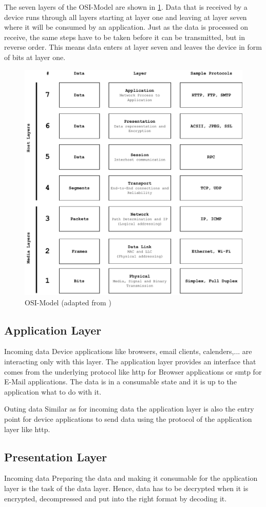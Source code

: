 The seven layers of the OSI-Model are shown in \cref{fig:osimodel}. Data that is received by a device runs through all layers starting at layer one and leaving at layer seven where it will be consumed by an application. Just as the data is processed on receive, the same steps have to be taken before it can be transmitted, but in reverse order. This means data enters at layer seven and leaves the device in form of bits at layer one.

\begin{figure}
\centering
\includegraphics[width=.5\textwidth]{graphics/osi-modell.pdf}
\caption{OSI-Model (adapted from \citet{wiki:osi-model})}
\label{fig:osimodel}
\end{figure}

\subsection{Application Layer}
Incoming data\newline
Device applications like browsers, email clients, calenders,... are interacting only with this layer. The application layer provides an interface that comes from the underlying protocol like \gls{http} for Browser applications or \gls{smtp} for E-Mail applications. The data is in a consumable state and it is up to the application what to do with it.

Outing data\newline
Similar as for incoming data the application layer is also the entry point for device applications to send data using the protocol of the application layer like \gls{http}. 


\subsection{Presentation Layer}
Incoming data\newline
Preparing the data and making it consumable for the application layer is the task of the data layer. 
Hence, data has to be decrypted when it is encrypted, decompressed and put into the right format by decoding it.

